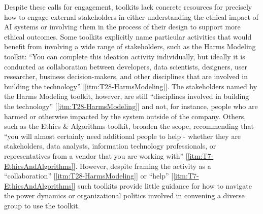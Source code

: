 \documentclass[acmsmall]{acmart}
\begin{document}
Despite these calls for engagement, toolkits lack concrete resources for precisely how to engage external stakeholders in either understanding the ethical impact of AI systems or involving them in the process of their design to support more ethical outcomes. Some toolkits explicitly name particular activities that would benefit from involving a wide range of stakeholders, such as the Harms Modeling toolkit: ``You can complete this ideation activity individually, but ideally it is conducted as collaboration between developers, data scientists, designers, user researcher, business decision-makers, and other disciplines that are involved in building the technology'' [\ref{itm:T28-HarmsModeling}].
The stakeholders named by the Harms Modeling toolkit, however, are still ``disciplines involved in building the technology'' [\ref{itm:T28-HarmsModeling}] and not, for instance, people who are harmed or otherwise impacted by the system outside of the company. Others, such as the Ethics \& Algorithms toolkit, broaden the scope, recommending that ``you will almost certainly need additional people to help - whether they are stakeholders, data analysts, information technology professionals, or representatives from a vendor that you are working with'' [\ref{itm:T7-EthicsAndAlgorithms}]. However, despite framing the activity as a ``collaboration'' [\ref{itm:T28-HarmsModeling}] or ``help'' [\ref{itm:T7-EthicsAndAlgorithms}] such toolkits provide little guidance for how to navigate the power dynamics or organizational politics involved in convening a diverse group to use the toolkit. %
\end{document}
